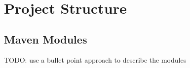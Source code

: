 \chapter{Project Structure}\label{ch:project_structure}

\section{Maven Modules}\label{sec:maven_modules}

TODO: use a bullet point approach to describe the modules
